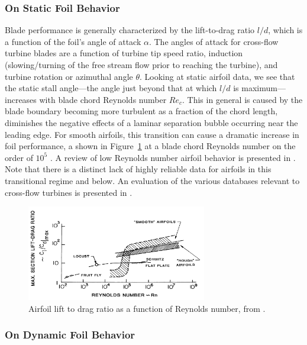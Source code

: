 \documentclass[energies,article,accept,moreauthors,pdftex,12pt,a4paper]{mdpi}
\begin{document}
\subsubsection{On Static Foil Behavior}

Blade performance is generally characterized by the lift-to-drag ratio $l/d$,
which is a function of the foil's angle of attack $\alpha$. The angles of attack
for cross-flow turbine blades are a function of turbine tip speed ratio,
induction (slowing/turning of the free stream flow prior to reaching the
turbine), and turbine rotation or azimuthal angle $\theta$. Looking at static
airfoil data, we see that the static stall angle---the angle just beyond that at
which $l/d$ is maximum---increases with blade chord Reynolds number $Re_c$. This
in general is caused by the blade boundary becoming more turbulent as a fraction
of the chord length, diminishes the negative effects of a laminar separation
bubble occurring near the leading edge. For smooth airfoils, this transition can
cause a dramatic increase in foil performance, a shown in
Figure~\ref{fig:McMasters} at a blade chord Reynolds number on the order of
$10^5$ \cite{McMasters1980}. A review of low Reynolds number airfoil behavior is
presented in \cite{Lissaman1983}. Note that there is a distinct lack of highly
reliable data for airfoils in this transitional regime and below. An evaluation
of the various databases relevant to cross-flow turbines is presented in
\cite{Bedon2014}.

\begin{figure}[ht]
\centering
\includegraphics[width=0.7\textwidth]{figures/McMasters-Henderson-1980}
\caption{Airfoil lift to drag ratio as a function of Reynolds number, from 
\cite{McMasters1980}.}
\label{fig:McMasters}
\end{figure}

\subsubsection{On Dynamic Foil Behavior}
\end{document}

